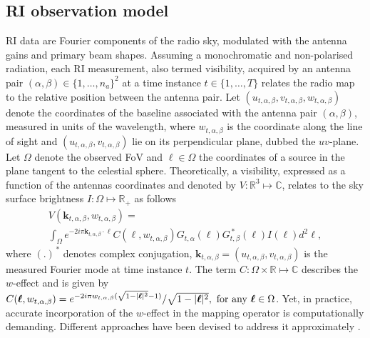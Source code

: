 \documentclass[fleqn,usenatbib]{mnras}
\newcommand{\ds}{\displaystyle}
\newcommand{\kb}{\ensuremath{\boldsymbol{k}}}
\newcommand{\lb}{\ensuremath{\boldsymbol{\ell}}}
\newcommand{\eC}{\mathbb{C}}
\newcommand{\eR}{\mathbb{R}}
\begin{document}
\subsection {RI observation model}\label{ssec:RIobs}

RI data are Fourier components of the radio sky, modulated with the antenna gains and primary beam shapes. 
Assuming a monochromatic and non-polarised radiation, each RI measurement, also termed visibility, acquired by an antenna pair $(\alpha, \beta)\in \{1, \ldots, n_a\}^2$ at a time instance $t\in \{1, \ldots,T\}$ relates the radio map to the relative position between the antenna pair. {{Let $(u_{t,\alpha,\beta},v_{t,\alpha,\beta},w_{t,\alpha,\beta})$ denote the coordinates of the baseline associated with the antenna pair  $(\alpha,\beta)$, measured in units of the wavelength, where $ w_{t,\alpha,\beta}$  is the coordinate along the line of sight and $(u_{t,\alpha,\beta},v_{t,\alpha,\beta})$ lie on its perpendicular plane, dubbed the $uv$-plane.}} 
 Let $\Omega$ denote the observed FoV and ${\lb}\in \Omega$ the coordinates of a source in the plane tangent to the celestial sphere. Theoretically, a visibility, expressed as a function of the antennas coordinates and denoted by $\ds V:\eR^3 \mapsto \eC$, relates to the sky surface brightness ${\ds I}:\Omega\mapsto \eR_+$ as follows
\begin{multline}
 \label{eq:model-cont}
 {\ds V}(\kb_{t,\alpha, \beta},w_{t,\alpha, \beta}) =\\\int_{\Omega} e^{-2i\pi \kb_{t,\alpha, \beta}\cdot \lb}{\ds C}(\lb, w_{{{t}},\alpha,\beta}) {\ds G}_{t,\alpha}(\lb) {\ds G}^{\,\ast}_{t,\beta}(\lb) {\ds I}(\lb) d^2\lb,
\end{multline}
where $(.)^{\,\ast}$ denotes complex conjugation, $ \kb_{t,\alpha, \beta}=({{u_{t,\alpha,\beta} ,v_{t,\alpha, \beta}}}) $ is the measured Fourier mode at time instance $t$. The term ${\ds C}:\Omega \times \eR \mapsto \eC$ describes the $w$-effect and is given by ${\ds C}(\lb, w_{{{t}},\alpha,\beta}) =e^{-2i\pi {w_{{{t}},\alpha,\beta}}(\sqrt{1- \vert {\lb} \vert^2}-1)}/{\sqrt{1-\vert\lb\vert^2}},~{\rm{for~ any}}~ \lb \in \Omega$. Yet, in practice, accurate incorporation of the $w$-effect in the mapping operator is computationally demanding. Different approaches have been devised to address it approximately \citep[e.g.][]{Cornwell2008,Offringa2014,Dabbech2017,Pratley2019,arras2021}.
\end{document}
